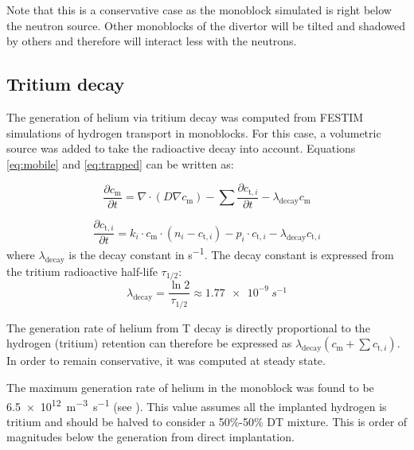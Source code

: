 Note that this is a conservative case as the \gls{monoblock} simulated is right below the neutron source.
Other \glspl{monoblock} of the \gls{divertor} will be tilted and shadowed by others and therefore will interact less with the neutrons.


\subsection{Tritium decay}

The generation of helium via tritium decay was computed from FESTIM simulations of hydrogen transport in \glspl{monoblock}.
For this case, a volumetric source was added to take the radioactive decay into account.
Equations \ref{eq:mobile} and \ref{eq:trapped} can be written as:

\begin{equation}
    \frac{\partial c_\mathrm{m}}{\partial t}=\nabla \cdot (D \nabla c_\mathrm{m} ) -\sum \frac{\partial c_{\mathrm{t}, i}}{\partial t} - \lambda_\mathrm{decay} c_\mathrm{m}
\end{equation}

\begin{equation}
    \frac{\partial c_{\mathrm{t}, i}}{\partial t}=k_i \cdot c_\mathrm{m} \cdot\left(n_{i}-c_{\mathrm{t}, i}\right)-p_i \cdot c_{\mathrm{t}, i} - \lambda_\mathrm{decay} c_{\mathrm{t}, i}
\end{equation}
where $\lambda_\mathrm{decay}$ is the decay constant in \si{s^{-1}}.
The decay constant is expressed from the tritium radioactive half-life $\tau_{1/2}$:
\begin{equation}
    \lambda_\mathrm{decay} = \frac{\ln 2}{\tau_{1/2}} \approx \SI{1.77e-9}{s^{-1}}
\end{equation}

The generation rate of helium from T decay is directly proportional to the hydrogen (tritium) retention can therefore be expressed as $\lambda_\mathrm{decay} (c_\mathrm{m} + \sum c_{\mathrm{t}, i})$.
In order to remain conservative, it was computed at steady state.

The maximum generation rate of helium in the \gls{monoblock} was found to be \SI{6.5e12}{m^{-3}.s^{-1}} (see ).
This value assumes all the implanted hydrogen is tritium and should be halved to consider a 50\%-50\% DT mixture.
This is order of magnitudes below the generation from direct implantation.


